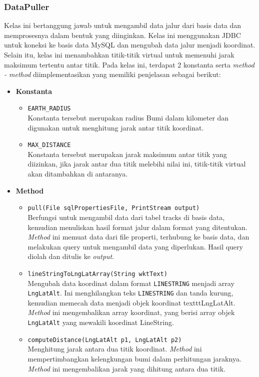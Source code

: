 \subsubsection{DataPuller}
\label{subss:datapuller}
Kelas ini bertanggung jawab untuk mengambil data jalur dari basis data dan memprosesnya dalam bentuk yang diinginkan. Kelas ini menggunakan JDBC untuk koneksi ke basis data MySQL dan mengubah data jalur menjadi koordinat. Selain itu, kelas ini menambahkan titik-titik virtual untuk memenuhi jarak maksimum tertentu antar titik. Pada kelas ini, terdapat 2 konstanta serta \textit{method - method} diimplementasikan yang memiliki penjelasan sebagai berikut:
\begin{itemize}
    \item \textbf{Konstanta}
    \begin{itemize}
        \item \texttt{EARTH\_RADIUS}
        \\ Konstanta tersebut merupakan radius Bumi dalam kilometer dan digunakan untuk menghitung jarak antar titik koordinat.
        \item \texttt{MAX\_DISTANCE}
        \\ Konstanta tersebut merupakan jarak maksimum antar titik yang diizinkan, jika jarak antar dua titik melebihi nilai ini, titik-titik virtual akan ditambahkan di antaranya.
    \end{itemize}

    \item \textbf{Method}
    \begin{itemize}
        \item \texttt{pull(File sqlPropertiesFile, PrintStream output)}
        \\ Berfungsi untuk mengambil data dari tabel tracks di basis data, kemudian menuliskan hasil format jalur dalam format yang ditentukan. \textit{Method} ini memuat data dari file properti, terhubung ke basis data, dan melakukan query untuk mengambil data yang diperlukan. Hasil query diolah dan ditulis ke \textit{output}.
        \item \texttt{lineStringToLngLatArray(String wktText)}
        \\ Mengubah data koordinat dalam format \texttt{LINESTRING} menjadi array \texttt{LngLatAlt}. Ini menghilangkan teks \texttt{LINESTRING} dan tanda kurung, kemudian memecah data menjadi objek koordinat texttt{LngLatAlt}. \textit{Method} ini mengembalikan array koordinat, yang berisi array objek \texttt{LngLatAlt} yang mewakili koordinat LineString.
        \item \texttt{computeDistance(LngLatAlt p1, LngLatAlt p2)}
         \\ Menghitung jarak antara dua titik koordinat. \textit{Method} ini mempertimbangkan kelengkungan bumi dalam perhitungan jaraknya. \textit{Method} ini mengembalikan jarak yang dihitung antara dua titik.


\end{itemize}
\end{itemize}
